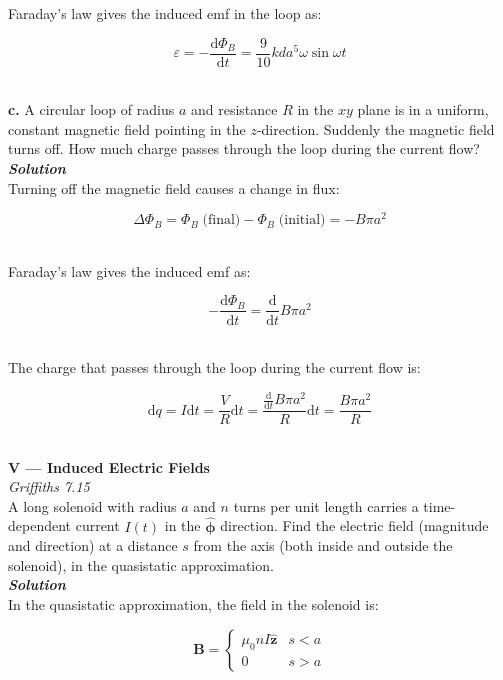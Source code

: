\documentclass[9pt]{extarticle}
\renewcommand{\v}[1]{{\bm #1}}
\newcommand{\hv}[1]{\hat{\bm{#1}}}
\newcommand{\bfit}[1]{\textbf{\textit{#1}}}
\renewcommand{\d}{\text{d}}
\newcommand{\ddt}[1]{\frac{\d #1}{\d t}}
\newcommand{\muo}{\mu_0}
\begin{document}
\begin{multicols*}{2}
Faraday's law gives the induced emf in the loop as:

$$\varepsilon = -\ddt{\Phi_B} = \frac{9}{10} kda^5 \omega \sin\omega t$$ \ 


 
\dotfill 

\hfill 

{\Large \bf c.} A circular loop of radius $a$ and resistance $R$ in the $xy$ plane is in  a uniform, constant magnetic field pointing in the $z$-direction. Suddenly the magnetic field turns off. How much charge passes through the loop during the current flow? \\ 

{\bfit{Solution}} \\ 

Turning off the magnetic field causes a change in flux:

$$\Delta \Phi_B = \Phi_B \; \text{(final)}  - \Phi_B \; \text{(initial)}  = -B\pi a^2$$ \ 

Faraday's law gives the induced emf as:

$$-\ddt{\Phi_B} = \ddt{} B\pi a^2$$ \ 

The charge that passes through the loop during the current flow is:

$$\d q = I\d t = \frac VR \d t = \frac{\ddt{} B\pi a^2}{R} \d t = \frac{B\pi a^2}{R}$$ \ 







\hrulefill 

\hfill 

{\LARGE \bf V --- Induced Electric Fields} \\ 

{\it Griffiths 7.15} \\  

A long solenoid with radius $a$ and $n$ turns per unit length carries a time-dependent current $I(t)$ in the $\hv \phi$ direction. Find the electric field (magnitude and direction) at a distance $s$ from the axis (both inside and outside the solenoid), in the quasistatic approximation. \\ 

{\bfit{Solution}} \\ 

In the quasistatic approximation, the field in the  solenoid is:

$$
\v B = 
\begin{cases}
	\muo n I \hv z & s < a \\ 
	0 & s > a 
\end{cases}
$$ \ 


\end{multicols*}
\end{document}
